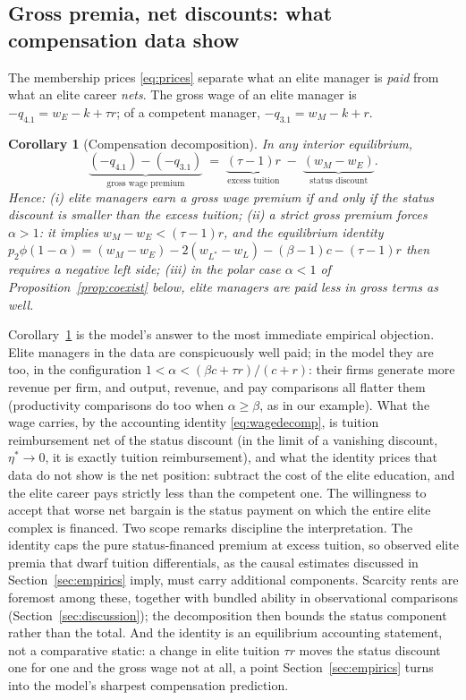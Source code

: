 \documentclass[12pt,letterpaper]{article}
\newtheorem{corollary}{Corollary}
\theoremstyle{definition}
\begin{document}
\subsection{Gross premia, net discounts: what compensation data show}

The membership prices \eqref{eq:prices} separate what an elite manager is \emph{paid} from what an elite career \emph{nets}.
The gross wage of an elite manager is $-q_{4.1} = w_E - k + \tau r$; of a competent manager, $-q_{3.1} = w_M - k + r$.

\begin{corollary}[Compensation decomposition]\label{cor:wages} In any interior equilibrium,
\begin{equation}\label{eq:wagedecomp}
  \underbrace{(-q_{4.1}) - (-q_{3.1})}_{\text{gross wage premium}}
  \;=\;
  \underbrace{(\tau-1)r}_{\text{excess tuition}}
  \;-\;
  \underbrace{(w_M - w_E)}_{\text{status discount}} .
\end{equation}
Hence: (i) elite managers earn a gross wage premium if and only if the status discount is smaller than the excess tuition; (ii) a strict gross premium forces $\alpha>1$: it implies $w_M-w_E<(\tau-1)r$, and the equilibrium identity $p_2\phi(1-\alpha) = (w_M-w_E) - 2(w_{L^\ast}-w_L) - (\beta-1)c - (\tau-1)r$ then requires a negative left side; (iii) in the polar case $\alpha<1$ of Proposition~\ref{prop:coexist} below, elite managers are paid less in gross terms as well.
\end{corollary}

Corollary~\ref{cor:wages} is the model's answer to the most immediate empirical objection.
Elite managers in the data are conspicuously well paid; in the model they are too, in the configuration $1 < \alpha < (\beta c+\tau r)/(c+r)$: their firms generate more revenue per firm, and output, revenue, and pay comparisons all flatter them (productivity comparisons do too when $\alpha\geq\beta$, as in our example).
What the wage carries, by the accounting identity \eqref{eq:wagedecomp}, is tuition reimbursement net of the status discount (in the limit of a vanishing discount, $\eta^\ast\to 0$, it is exactly tuition reimbursement), and what the identity prices that data do not show is the net position: subtract the cost of the elite education, and the elite career pays strictly less than the competent one.
The willingness to accept that worse net bargain is the status payment on which the entire elite complex is financed.
Two scope remarks discipline the interpretation.
The identity caps the pure status-financed premium at excess tuition, so observed elite premia that dwarf tuition differentials, as the causal estimates discussed in Section~\ref{sec:empirics} imply, must carry additional components.
Scarcity rents are foremost among these, together with bundled ability in observational comparisons (Section~\ref{sec:discussion}); the decomposition then bounds the status component rather than the total.
And the identity is an equilibrium accounting statement, not a comparative static: a change in elite tuition $\tau r$ moves the status discount one for one and the gross wage not at all, a point Section~\ref{sec:empirics} turns into the model's sharpest compensation prediction.
\end{document}
